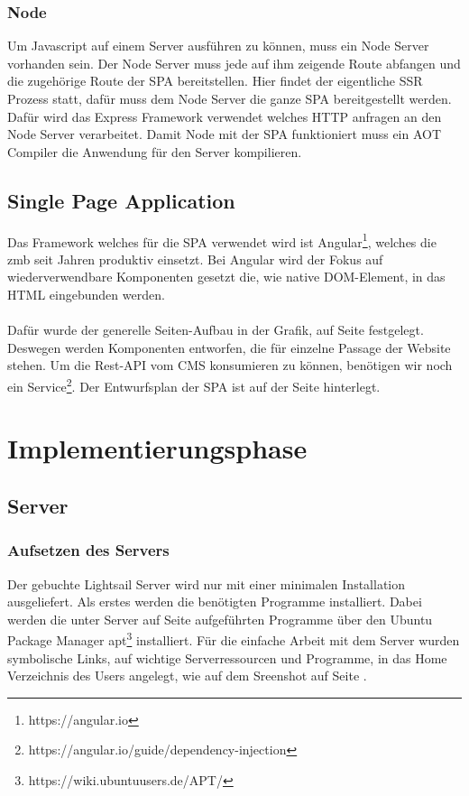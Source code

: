 \documentclass[11pt,a4paper]{article}
\begin{document}
\subsubsection{Node}
Um Javascript auf einem Server ausführen zu können, muss ein Node Server vorhanden sein.
Der Node Server muss jede auf ihm zeigende Route abfangen und die zugehörige Route der SPA bereitstellen. Hier findet der eigentliche SSR Prozess statt, dafür muss dem Node Server die ganze SPA bereitgestellt werden. Dafür wird das Express Framework verwendet welches HTTP anfragen an den Node Server verarbeitet. Damit Node mit der SPA funktioniert muss ein \acs{AOT} Compiler die Anwendung für den Server kompilieren.
\subsection{Single Page Application}
Das Framework welches für die SPA verwendet wird ist Angular\footnote{https://angular.io}, welches die zmb seit Jahren produktiv einsetzt. Bei Angular wird der Fokus auf wiederverwendbare Komponenten gesetzt die, wie native DOM-Element, in das HTML eingebunden werden.\\\\
Dafür wurde der generelle Seiten-Aufbau in der Grafik, auf Seite \pageref{sec:epage} 
festgelegt. Deswegen werden Komponenten entworfen, die für einzelne Passage der Website stehen. 
Um die Rest-API vom CMS  konsumieren zu können, benötigen wir noch ein Service\footnote{https://angular.io/guide/dependency-injection}. 
Der Entwurfsplan der SPA ist auf der Seite \pageref{sec:espa} hinterlegt.
\section{Implementierungsphase}
\subsection{Server}
\subsubsection{Aufsetzen des Servers}
Der gebuchte Lightsail Server wird nur mit einer minimalen Installation ausgeliefert. Als erstes werden die benötigten Programme installiert. Dabei werden die unter Server auf Seite \pageref{sec:progs} aufgeführten Programme über den Ubuntu Package Manager apt\footnote{https://wiki.ubuntuusers.de/APT/} installiert. Für die einfache Arbeit mit dem Server wurden symbolische Links, auf wichtige Serverressourcen und Programme, in das Home Verzeichnis des Users angelegt, wie auf dem Sreenshot auf Seite \pageref{sec:ordner} .
\end{document}
